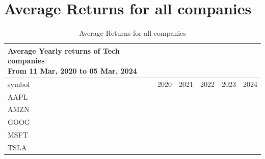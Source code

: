 \documentclass[
  12pt]{article}
\theoremstyle{definition}
\theoremstyle{remark}
\begin{document}
\section{Average Returns for all
companies}\label{average-returns-for-all-companies}

\begin{longtable}{lrrrrr}

\caption{\label{tbl-average-returns-all-companies}Average Returns for
all companies}

\tabularnewline

\caption*{
{\large Average Yearly returns of Tech companies} \\
{\small From 11 Mar, 2020 to 05 Mar, 2024}
} \\
\toprule
symbol & 2020 & 2021 & 2022 & 2023 & 2024 \\
\midrule\addlinespace[2.5pt]
AAPL & \cellcolor[HTML]{90EE90}{\textcolor[HTML]{FFFFFF}{$0.0037$}} & \cellcolor[HTML]{90EE90}{\textcolor[HTML]{FFFFFF}{$0.0012$}} & \cellcolor[HTML]{FF0000}{\textcolor[HTML]{FFFFFF}{$-0.0012$}} & \cellcolor[HTML]{90EE90}{\textcolor[HTML]{FFFFFF}{$0.0016$}} & \cellcolor[HTML]{FF0000}{\textcolor[HTML]{FFFFFF}{$-0.0022$}} \\
AMZN & \cellcolor[HTML]{90EE90}{\textcolor[HTML]{FFFFFF}{$0.0033$}} & \cellcolor[HTML]{90EE90}{\textcolor[HTML]{FFFFFF}{$0.0001$}} & \cellcolor[HTML]{FF0000}{\textcolor[HTML]{FFFFFF}{$-0.0027$}} & \cellcolor[HTML]{90EE90}{\textcolor[HTML]{FFFFFF}{$0.0024$}} & \cellcolor[HTML]{90EE90}{\textcolor[HTML]{FFFFFF}{$0.0036$}} \\
GOOG & \cellcolor[HTML]{90EE90}{\textcolor[HTML]{FFFFFF}{$0.0022$}} & \cellcolor[HTML]{90EE90}{\textcolor[HTML]{FFFFFF}{$0.0020$}} & \cellcolor[HTML]{FF0000}{\textcolor[HTML]{FFFFFF}{$-0.0019$}} & \cellcolor[HTML]{90EE90}{\textcolor[HTML]{FFFFFF}{$0.0019$}} & \cellcolor[HTML]{FF0000}{\textcolor[HTML]{FFFFFF}{$-0.0011$}} \\
MSFT & \cellcolor[HTML]{90EE90}{\textcolor[HTML]{FFFFFF}{$0.0023$}} & \cellcolor[HTML]{90EE90}{\textcolor[HTML]{FFFFFF}{$0.0016$}} & \cellcolor[HTML]{FF0000}{\textcolor[HTML]{FFFFFF}{$-0.0013$}} & \cellcolor[HTML]{90EE90}{\textcolor[HTML]{FFFFFF}{$0.0018$}} & \cellcolor[HTML]{90EE90}{\textcolor[HTML]{FFFFFF}{$0.0023$}} \\
TSLA & \cellcolor[HTML]{90EE90}{\textcolor[HTML]{FFFFFF}{$0.0090$}} & \cellcolor[HTML]{90EE90}{\textcolor[HTML]{FFFFFF}{$0.0016$}} & \cellcolor[HTML]{FF0000}{\textcolor[HTML]{FFFFFF}{$-0.0042$}} & \cellcolor[HTML]{90EE90}{\textcolor[HTML]{FFFFFF}{$0.0028$}} & \cellcolor[HTML]{FF0000}{\textcolor[HTML]{FFFFFF}{$-0.0065$}} \\
\bottomrule

\end{longtable}
\end{document}
